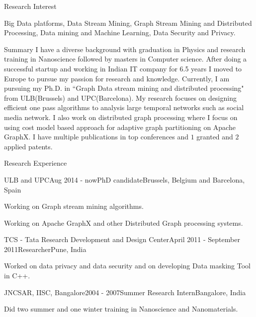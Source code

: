 \documentclass{resume} %
\begin{document}
\begin{rSection}{Research Interest}

Big Data platforms, Data Stream Mining, Graph Stream Mining and Distributed Processing, Data mining and Machine Learning, Data Security and Privacy.

\end{rSection}
\begin{rSection}{Summary}
I have a diverse background with graduation in Physics and research training in Nanoscience followed by masters in Computer science. After doing a successful startup and working in Indian IT company for 6.5 years I moved to Europe to pursue my passion for research and knowledge. Currently, I am pursuing my Ph.D. in ``Graph Data stream mining and distributed processing" from ULB(Brussels) and UPC(Barcelona). My research focuses on designing efficient one pass algorithms to analysis large temporal networks such as social media network. I also work on distributed graph processing where I focus on using cost model based approach for adaptive graph partitioning on Apache GraphX. I have multiple publications in top conferences and $1$ granted and $2$ applied patents.
\end{rSection}

\begin{rSection}{Research Experience}
\begin{rSubsection}{ULB and UPC}{Aug 2014 - now}{PhD candidate}{Brussels, Belgium and Barcelona, Spain}
\item Working on Graph stream mining algorithms.
\item Working on Apache GraphX and other Distributed Graph processing systems.
\end{rSubsection}
\begin{rSubsection}{TCS - Tata Research Development and Design Center}{April 2011 - September 2011}{Researcher}{Pune, India}
\item Worked on data privacy and data security and on developing Data masking Tool in C++.
\end{rSubsection}

\begin{rSubsection}{JNCSAR, IISC, Bangalore}{2004 - 2007}{Summer Research Intern}{Bangalore, India}
\item Did two summer and one winter training in Nanoscience and Nanomaterials.
\end{rSubsection}
\end{rSection}
\end{document}
